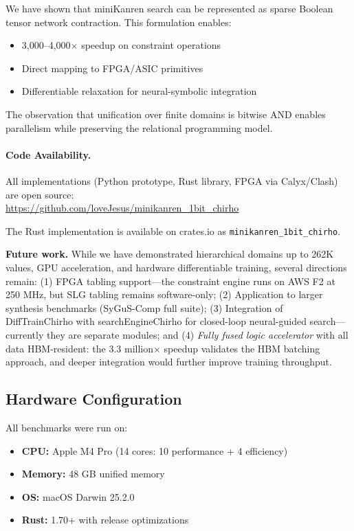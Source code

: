 \documentclass[11pt,a4paper]{article}
\begin{document}
We have shown that miniKanren search can be represented as sparse Boolean tensor network contraction.
This formulation enables:
\begin{itemize}
  \item 3,000--4,000$\times$ speedup on constraint operations
  \item Direct mapping to FPGA/ASIC primitives
  \item Differentiable relaxation for neural-symbolic integration
\end{itemize}

The observation that unification over finite domains is bitwise AND enables parallelism while preserving the relational programming model.

\paragraph{Code Availability.}
All implementations (Python prototype, Rust library, FPGA via Calyx/Clash) are open source:\\
\url{https://github.com/loveJesus/minikanren_1bit_chirho}

The Rust implementation is available on crates.io as \texttt{minikanren\_1bit\_chirho}.

\textbf{Future work.}
While we have demonstrated hierarchical domains up to 262K values, GPU acceleration, and hardware differentiable training, several directions remain:
(1) FPGA tabling support---the constraint engine runs on AWS F2 at 250 MHz, but SLG tabling remains software-only;
(2) Application to larger synthesis benchmarks (SyGuS-Comp full suite);
(3) Integration of DiffTrainChirho with searchEngineChirho for closed-loop neural-guided search---currently they are separate modules; and
(4) \emph{Fully fused logic accelerator} with all data HBM-resident: the 3.3 million$\times$ speedup validates the HBM batching approach, and deeper integration would further improve training throughput.

\subsection*{Hardware Configuration}

All benchmarks were run on:
\begin{itemize}
  \item \textbf{CPU:} Apple M4 Pro (14 cores: 10 performance + 4 efficiency)
  \item \textbf{Memory:} 48 GB unified memory
  \item \textbf{OS:} macOS Darwin 25.2.0
  \item \textbf{Rust:} 1.70+ with release optimizations
\end{itemize}
\end{document}
